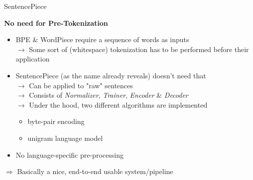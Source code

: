 \documentclass[]{beamer}
\begin{document}
\begin{frame}{SentencePiece \href{https://www.aclweb.org/anthology/D18-2012.pdf}{}}

	\textbf{No need for Pre-Tokenization}

	\begin{itemize}
		\item BPE \& WordPiece require a sequence of words as inputs\\
					$\rightarrow$ Some sort of (whitespace) tokenization has to be performed before their application
		\item SentencePiece (as the name already reveals) doesn't need that\\
					$\rightarrow$ Can be applied to "raw" sentences\\
					$\rightarrow$ Consists of \textit{Normalizer}, \textit{Trainer}, \textit{Encoder} \& \textit{Decoder}\\
					$\rightarrow$ Under the hood, two different algorithms are implemented
					\begin{itemize}
						\item byte-pair encoding \href{https://www.aclweb.org/anthology/P16-1162.pdf}{}
						\item unigram language model \href{https://www.aclweb.org/anthology/P18-1007.pdf}{}
					\end{itemize}
		\item No language-specific pre-processing
	\end{itemize}
	
	\vspace{.3cm}
	
	$\Rightarrow$ Basically a nice, end-to-end usable system/pipeline
	
\end{frame}
\end{document}
